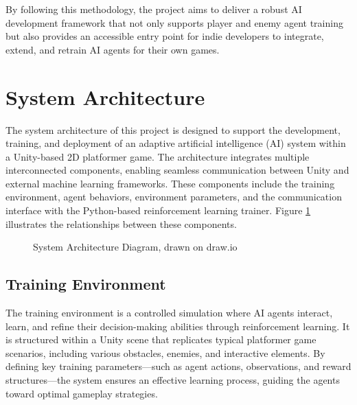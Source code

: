 \documentclass[12pt,oneside,openright,a4paper]{cpe-english-project}
\begin{document}
By following this methodology, the project aims to deliver a robust AI development framework that not only supports player and enemy agent training but also provides an accessible entry point for indie developers to integrate, extend, and retrain AI agents for their own games.\par

\section{System Architecture}

The system architecture of this project is designed to support the development, training, and deployment of an adaptive artificial intelligence (AI) system within a Unity-based 2D platformer game. The architecture integrates multiple interconnected components, enabling seamless communication between Unity and external machine learning frameworks. These components include the training environment, agent behaviors, environment parameters, and the communication interface with the Python-based reinforcement learning trainer. Figure \ref{fig:SystemDiagram} illustrates the relationships between these components.\par

\begin{figure}[!h]
\centering
{}
\caption{System Architecture Diagram, drawn on draw.io}\label{fig:SystemDiagram}
\end{figure}
\FloatBarrier
\subsection{Training Environment}
The training environment is a controlled simulation where AI agents interact, learn, and refine their decision-making abilities through reinforcement learning. It is structured within a Unity scene that replicates typical platformer game scenarios, including various obstacles, enemies, and interactive elements. By defining key training parameters—such as agent actions, observations, and reward structures—the system ensures an effective learning process, guiding the agents toward optimal gameplay strategies.
\end{document}
